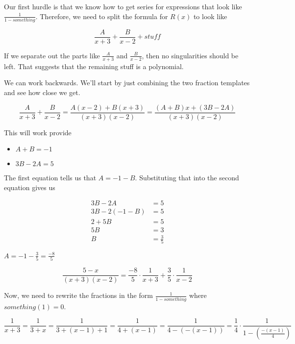 \documentclass{ximera}
\begin{document}
Our first hurdle is that we know how to get series for expressions that look like $\frac{1}{1-something}$.  Therefore, we need to split the formula for $R(x)$ to look like

\[    \frac{A}{x+3} + \frac{B}{x-2} + stuff          \]



If we separate out the parts like $\frac{A}{x+3}$ and $\frac{B}{x-2}$, then no singularities should be left.  That suggests that the remaining stuff is a polynomial.


We can work backwards. We'll start by just combining the two fraction templates and see how close we get.





\[  \frac{A}{x+3} + \frac{B}{x-2}  = \frac{A(x-2) + B(x+3)}{(x+3)(x-2)}  = \frac{(A+B)x + (3B-2A)}{(x+3)(x-2)}       \]


This will work provide

\begin{itemize}
\item $A+B = -1$
\item $3B-2A = 5$
\end{itemize}

The first equation tells us that $A = -1 - B$.  Substituting that into the second equation gives us 


\begin{align*}
3B-2A     & = 5     \\
3B-2(-1 -B)     & = 5     \\
2 + 5B     & = 5     \\
5B     & = 3     \\
B & = \frac{3}{5}
\end{align*}


$A = -1 - \frac{3}{5} = \frac{-8}{5}$



\[ \frac{5-x}{(x+3)(x-2)}     =  \frac{-8}{5} \cdot \frac{1}{x+3} + \frac{3}{5} \cdot \frac{1}{x-2}       \]



Now, we need to rewrite the fractions in the form $\frac{1}{1 - something}$ where   $something(1) = 0$.






\[    \frac{1}{x+3}   = \frac{1}{3+x}  = \frac{1}{3+(x-1)+1}     = \frac{1}{4+(x-1)}     = \frac{1}{4-(-(x-1))}      =   \frac{1}{4} \cdot \frac{1}{1-\left( \frac{-(x-1)}{4} \right) }   \]
\end{document}

